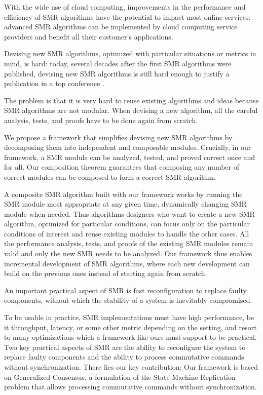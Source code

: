 With the wide use of cloud computing, improvements in the performance and efficiency of SMR algorithms have the potential to impact most online services: advanced SMR algorithms can be implemented by cloud computing service providers and benefit all their customer's applications.

Devising new SMR algorithms, optimized with particular situations or metrics in mind, is hard: today, several decades after the first SMR algorithms \cite{Lamport98ParttimeParliament,BirmanJoseph87ReliableCommunicationPresenceFailures,OkiLiskov88ViewstampedReplicationGeneralPrimaryCopy,DworkLynchStockmeyer84ConsensusPresencePartialSynchronyPreliminaryVersion} were published, devising new SMR algorithms is still hard enough to justify a publication in a top conference \cite{MoraruAndersenKaminsky13ThereIsMoreConsensusEgalitarianParliaments,OngaroOusterhout14SearchUnderstandableConsensusAlgorithm}.

The problem is that it is very hard to reuse existing algorithms and ideas because SMR algorithms are not modular. When devising a new algorithm, all the careful analysis, tests, and proofs have to be done again from scratch.

We propose a framework that simplifies devising new SMR algorithms by decomposing them into independent and composable modules.
Crucially, in our framework, a SMR module can be analyzed, tested, and proved correct  once and for all. 
Our composition theorem guarantees that composing any number of correct modules can be composed to form a correct SMR algorithm. 

A composite SMR algorithm built with our framework works by running the SMR module most appropriate at any given time, dynamically changing SMR module when needed.
Thus algorithms designers who want to create a new SMR algorithm, optimized for particular conditions, can focus only on the particular conditions of interest and reuse existing modules to handle the other cases. All the performance analysis, tests, and proofs of the existing SMR modules remain valid and only the new SMR needs to be analyzed.
Our framework thus enables incremental development of SMR algorithms, where each new development can build on the previous ones instead of starting again from scratch.

An important practical aspect of SMR is fast reconfiguration to replace faulty components, without which the stability of a system is inevitably compromised.

To be usable in  practice, SMR implementations must have high performance, be it throughput, latency, or some other metric depending on the setting, and resort to many optimizations which a framework like ours must support to be practical.
Two key practical aspects of SMR are the ability to reconfigure the system to replace faulty components and the ability to process commutative commands without synchronization.
There lies our key contribution: 
Our framework is based on Generalized Consensus, a formulation of the State-Machine Replication problem that allows processing commutative commands without synchronization.

